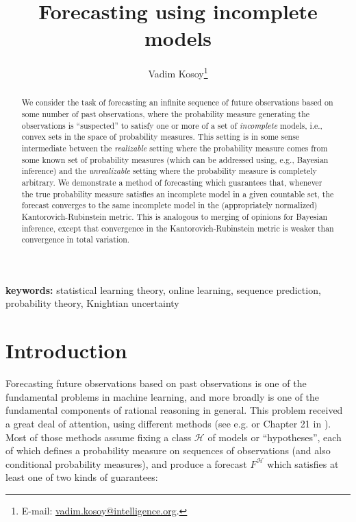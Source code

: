 \documentclass[11pt]{article}
\theoremstyle{definition}
\theoremstyle{plain}
\newcommand{\MC}{\mathcal{H}}
\begin{document}
\title{Forecasting using incomplete models}
\author{Vadim Kosoy\footnote{E-mail: \href{mailto:vadim.kosoy@intelligence.org}{vadim.kosoy@intelligence.org}.} }
\date{}%
\maketitle

\begin{abstract}
We consider the task of forecasting an infinite sequence of future observations based on some number of past observations, where the probability measure generating the observations is \enquote{suspected} to satisfy one or more of a set of \emph{incomplete} models, i.e., convex sets in the space of probability measures. This setting is in some sense intermediate between the \emph{realizable} setting where the probability measure comes from some known set of probability measures (which can be addressed using, e.g., Bayesian inference) and the \emph{unrealizable} setting where the probability measure is completely arbitrary. We demonstrate a method of forecasting which guarantees that, whenever the true probability measure satisfies an incomplete model in a given countable set, the forecast converges to the same incomplete model in the (appropriately normalized) Kantorovich-Rubinstein metric. This is analogous to merging of opinions for Bayesian inference, except that convergence in the Kantorovich-Rubinstein metric is weaker than convergence in total variation.
\end{abstract}

\textbf{keywords:} statistical learning theory, online learning, sequence prediction, probability theory, Knightian uncertainty


\section{Introduction}

Forecasting future observations based on past observations is one of the fundamental problems in machine learning, and more broadly is one of the fundamental components of rational reasoning in general. This problem received a great deal of attention, using different methods (see e.g. \cite{Cesa-Bianchi_2006} or Chapter 21 in \cite{Shalev-Shwartz_2014}). Most of those methods assume fixing a class $\MC$ of models or \enquote{hypotheses}, each of which defines a probability measure on sequences of observations (and also conditional probability measures), and produce a forecast $F^\MC$ which satisfies at least one of two kinds of guarantees:
\end{document}
